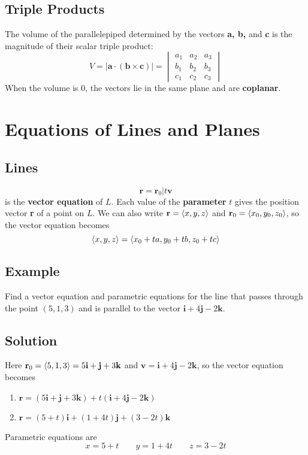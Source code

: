 \subsection*{Triple Products}
The volume of the parallelepiped determined by the vectors \textbf{a, b,} and \textbf{c}
is the magnitude of their scalar triple product:
$$V=|\mathbf{a\cdot (b\times c)}|=\begin{vmatrix}
        a_1 & a_2 & a_3 \\
        b_1 & b_2 & b_3 \\
        c_1 & c_2 & c_3
    \end{vmatrix}$$
When the volume is 0, the vectors lie in the same plane and are \textbf{coplanar}.

\section{Equations of Lines and Planes}

\subsection*{Lines}

$$\textbf{r}=\textbf{r}_0|t\textbf{v}$$
is the \textbf{vector equation} of $L$. Each value of the \textbf{parameter} $t$ gives
the position vector \textbf{r} of a point on $L$. We can also write $\textbf{r}=\ev{x,y,z}$
and $\textbf{r}_0=\ev{x_0,y_0,z_0}$, so the vector equation becomes
$$\ev{x,y,z}=\ev{x_0+ta,y_0+tb,z_0+tc}$$

\subsection*{Example}
Find a vector equation and parametric equations for the line that passes through the point
$(5,1,3)$ and is parallel to the vector $\textbf{i}+4\textbf{j}-2\textbf{k}$.

\subsection*{Solution}
Here $\textbf{r}_0=\ev{5,1,3}=5\textbf{i}+\textbf{j}+3\textbf{k}$ and
$\textbf{v}=\textbf{i}+4\textbf{j}-2\textbf{k}$, so the vector equation becomes
\begin{enumerate}
    \item[] $\textbf{r}=(5\textbf{i}+\textbf{j}+3\textbf{k})+t(\textbf{i}+4\textbf{j}-2\textbf{k})$
    \item[] $\textbf{r}=(5+t)\textbf{i}+(1+4t)\textbf{j}+(3-2t)\textbf{k}$
\end{enumerate}
Parametric equations are
$$x=5+t \qquad y=1+4t \qquad z=3-2t$$

